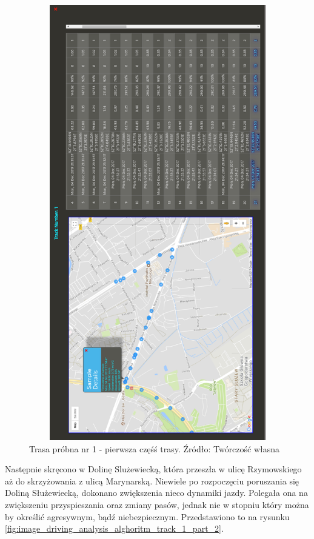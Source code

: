 \begin{figure}[H]
	\centering
	\includegraphics[height=19cm, width=13cm]{img/driving_analysis/test_track_1_lagodna.png}
	\caption{Trasa próbna nr 1 - pierwsza częśś trasy. Źródło: Twórczość własna}
	\label{fig:image_driving_analysis_alghoritm_track_1_part_1}
\end{figure}

Następnie skręcono w Dolinę Slużewiecką, która przeszła w ulicę Rzymowskiego aż do skrzyżowania z ulicą Marynarską. Niewiele po rozpoczęciu poruszania się Doliną Służewiecką, dokonano zwiększenia nieco dynamiki jazdy. Polegała ona na zwiększeniu przyspieszania oraz zmiany pasów, jednak nie w stopniu który można by określić agresywnym, bądź niebezpiecznym. Przedstawiono to na rysunku \ref{fig:image_driving_analysis_alghoritm_track_1_part_2}.

